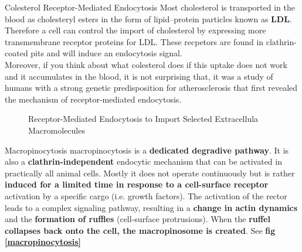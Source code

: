 \documentclass[../main.tex]{subfiles}
\begin{document}
\begin{ExWithTitle}{Colesterol Receptor-Mediated Endocytosis}
	Most cholesterol is transported in the blood as cholesteryl esters in the form of 
	lipid–protein particles known as \textbf{\gls{LDL}}. Therefore a cell can control the import of cholesterol by expressing more transmembrane receptor proteins for LDL. These recpetors are found in clathrin-coated pits and will induce an endocytosis signal.\\
	\indent Moreover, if you think about what colesterol does if this uptake does not work and it accumulates in the blood, it is not surprising that, it was a study of humans with a strong genetic predisposition for atherosclerosis that first revealed the mechanism of receptor-mediated endocytosis.
\end{ExWithTitle}

\begin{figure}[H]
	\centering
	\caption{Receptor-Mediated Endocytosis to Import Selected Extracellula Macromolecules}
\end{figure}

\begin{RemarkWithTitel}{Macropinocytosis}
	\gls{macropinocytosis} is a \textbf{dedicated degradive pathway}. It is also a \textbf{clathrin-independent} endocytic mechanism that can be activated in practically all animal cells. Mostly it does not operate continuously but is rather \textbf{induced for a limited time in response to a cell-surface receptor} activation by a specific cargo (i.e. growth factors). The activation of the rector leads to a complex signaling pathway, resulting in a \textbf{change in actin dynamics} and the \textbf{formation of ruffles} (cell-surface protrusions). When the \textbf{ruffel collapses back onto the cell, the macropinosome is created}. See\textbf{ fig \ref{macropinocytosis}}
\end{RemarkWithTitel}
\end{document}
